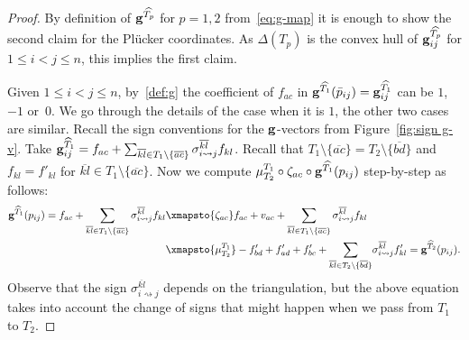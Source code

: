 \documentclass[10pt,a4paper]{amsart}
\newcommand{\thref}[1]{\ref{#1}}
\numberwithin{equation}{section}
\begin{document}
\begin{proof}
By definition of ${\bf g}^{\widehat{T_p}}$ for $p=1,2$ from~\eqref{eq:g-map} it is enough to show the second claim for the Pl\"ucker coordinates.
As $\Delta(T_p)$ is the convex hull of ${\bf g}^{\widehat{T_p}}_{ij}$ for $1\le i<j\le n$, this implies the first claim.

Given $1\le i<j\le n$, by~\thref{def:g}
the coefficient of $f_{ac}$ in ${\bf g}^{\widehat{T_1}}(\bar p_{ij})={\bf g}^{\widehat{T_1}}_{ij}$ can be $1$, $-1$ or~$0$.
We go through the details of the case when it is $1$, the other two cases are similar.
Recall the sign conventions for the ${\bf g}$-vectors from Figure~\ref{fig:sign g-v}.
Take
${\bf g}^{\widehat{T}_1}_{ij}= f_{ac}+\sum_{\overline{kl}\in T_1\setminus \{\overline{ac}\} } \sigma_{i \rightsquigarrow j}^{\overline{kl}} f_{kl}$.
Recall that $T_1\setminus \{\overline{ac}\}= T_2\setminus \big\{\overline{bd}\big\}$ and $f_{kl}=f'_{kl}$ for $\overline{kl}\in T_1 \setminus \{ \overline{ac} \}$. Now we compute $\mu^{T_1}_{T_2} \circ \zeta_{ac} \circ {\bf g}^{\widehat{T_1}}(p_{ij})$ step-by-step as follows:
\begin{align*}
{\bf g}^{\widehat{T}_1}(p_{ij}) = f_{ac} + \sum_{\overline{kl}\in T_1 \setminus \{ \overline{ac} \} } \sigma_{i \rightsquigarrow j}^{\overline{kl}} f_{kl} &\xmapsto{\zeta_{ac}} f_{ac} + v_{ac} + \sum_{\overline{kl}\in T_1 \setminus \{ \overline{ac} \} } \sigma_{i \rightsquigarrow j}^{\overline{kl}} f_{kl} \\
&\xmapsto{\mu^{T_1}_{T_2}} -f'_{bd}+f'_{ad}+f'_{bc}+\displaystyle{\sum_{\overline{kl}\in T_2\setminus \{ \overline{bd} \} }} \sigma_{i \rightsquigarrow j}^{\overline{kl}} f'_{kl} = {\bf g}^{\widehat{T}_2}(p_{ij}).
\end{align*}
Observe that the sign $\sigma_{i \rightsquigarrow j}^{\overline{kl}}$ depends on the triangulation, but the above equation takes into account the change of signs that might happen when we pass from $T_1$ to $T_2$.
\end{proof}
\end{document}
